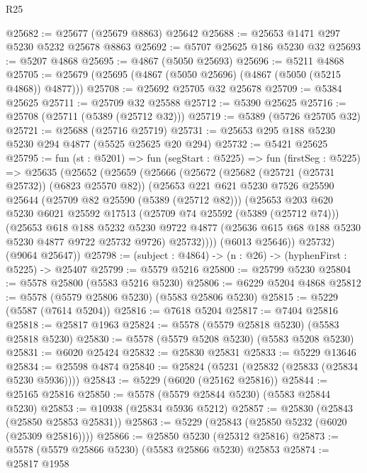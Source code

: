 \begin{lexlean}{R25}
\begin{coremodule}
@25682 := @25677 (@25679 @8863) @25642
@25688 := @25653 @1471 @297 @5230 @5232 @25678 @8863
@25692 := @5707 @25625 @186 @5230 @32
@25693 := @5207 @4868
@25695 := @4867 (@5050 @25693)
@25696 := @5211 @4868
@25705 := @25679 (@25695 (@4867 (@5050 @25696) (@4867 (@5050 (@5215 @4868)) @4877)))
@25708 := @25692 @25705 @32 @25678
@25709 := @5384 @25625
@25711 := @25709 @32 @25588
@25712 := @5390 @25625
@25716 := @25708 (@25711 (@5389 (@25712 @32)))
@25719 := @5389 (@5726 @25705 @32)
@25721 := @25688 (@25716 @25719)
@25731 := @25653 @295 @188 @5230 @5230 @294 @4877 (@5525 @25625 @20 @294)
@25732 := @5421 @25625
@25795 := fun (st : @5201) =>
  fun (segStart : @5225) =>
  fun (firstSeg : @5225) =>
  @25635
    (@25652
      (@25659
        (@25666
          (@25672
            (@25682 (@25721 (@25731 @25732)) (@6823 @25570 @82))
            (@25653
              @221
              @621
              @5230
              @7526
              @25590
              @25644
              (@25709 @82 @25590 (@5389 (@25712 @82)))
              (@25653
                @203
                @620
                @5230
                @6021
                @25592
                @17513
                (@25709 @74 @25592 (@5389 (@25712 @74)))
                (@25653
                  @618
                  @188
                  @5232
                  @5230
                  @9722
                  @4877
                  (@25636 @615 @68 @188 @5230 @5230 @4877 @9722 @25732 @9726)
                  @25732))))
          (@6013 @25646))
        @25732)
      (@9064 @25647))
@25798 := (subject : @4864) -> (n : @26) -> (hyphenFirst : @5225) -> @25407
@25799 := @5579 @5216
@25800 := @25799 @5230
@25804 := @5578 @25800 (@5583 @5216 @5230)
@25806 := @6229 @5204 @4868
@25812 := @5578 (@5579 @25806 @5230) (@5583 @25806 @5230)
@25815 := @5229 (@5587 (@7614 @5204))
@25816 := @7618 @5204
@25817 := @7404 @25816
@25818 := @25817 @1963
@25824 := @5578 (@5579 @25818 @5230) (@5583 @25818 @5230)
@25830 := @5578 (@5579 @5208 @5230) (@5583 @5208 @5230)
@25831 := @6020 @25424
@25832 := @25830 @25831
@25833 := @5229 @13646
@25834 := @25598 @4874
@25840 := @25824 (@5231 (@25832 (@25833 (@25834 @5230 @5936))))
@25843 := @5229 (@6020 (@25162 @25816))
@25844 := @25165 @25816
@25850 := @5578 (@5579 @25844 @5230) (@5583 @25844 @5230)
@25853 := @10938 (@25834 @5936 @5212)
@25857 := @25830 (@25843 (@25850 @25853 @25831))
@25863 := @5229 (@25843 (@25850 @5232 (@6020 (@25309 @25816))))
@25866 := @25850 @5230 (@25312 @25816)
@25873 := @5578 (@5579 @25866 @5230) (@5583 @25866 @5230) @25853
@25874 := @25817 @1958

\end{coremodule}
\end{lexlean}
